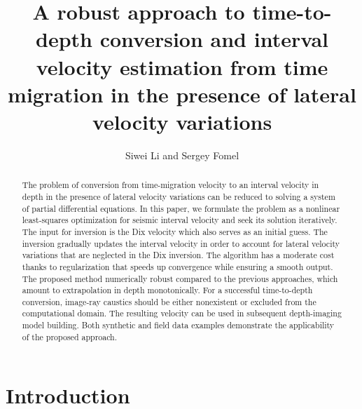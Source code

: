 
\title{A robust approach to time-to-depth conversion and interval velocity 
estimation from time migration in the presence of lateral velocity variations}

\author{Siwei Li and Sergey Fomel}


\address{Bureau of Economic Geology \\
John A. and Katherine G. Jackson School of Geosciences \\
The University of Texas at Austin \\
University Station, Box X \\
Austin, TX 78713-8924}


\maketitle

\begin{abstract}

The problem of conversion from time-migration velocity to an interval velocity in depth in 
the presence of lateral velocity variations can be reduced to solving a system 
of partial differential equations. In this paper, we formulate the problem as a nonlinear 
least-squares optimization for seismic interval velocity and seek its solution 
iteratively. The input for inversion is the Dix velocity which also serves as an initial guess. The inversion 
gradually updates the interval velocity in order to account for lateral velocity 
variations that are neglected in the Dix inversion. The algorithm has a moderate cost thanks 
to regularization that speeds up convergence while ensuring a smooth output. The proposed method 
 numerically robust compared to the previous approaches, which amount to extrapolation 
in depth monotonically. For a successful time-to-depth conversion, image-ray caustics should be either 
nonexistent or excluded from the computational domain. The resulting velocity can be used in subsequent 
depth-imaging model building. Both synthetic and field data examples demonstrate the applicability 
of the proposed approach.

\end{abstract}

\section{Introduction}

